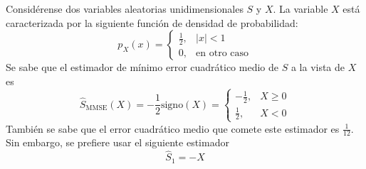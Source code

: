 \ifspanish

\question Considérense dos variables aleatorias unidimensionales $S$ y $X$. La variable $X$ está caracterizada por la siguiente función de densidad de probabilidad:
 $$p_X(x) =  \left\{\begin{array}{ll}
						  	\displaystyle
								  \frac{1}{2}, & |x|<1 \\
	  							  0, & {\mbox{en otro caso}} 
	 					 \end{array} 
						  \right. $$   
Se sabe que el estimador de mínimo error cuadrático medio de $S$ a la vista de $X$ es
 $$\hat{S}_\text{MMSE}(X)= - \frac{1}{2} \mbox{signo}\left(X \right)   =  \left\{\begin{array}{ll}
						  	\displaystyle
								 - \frac{1}{2}, & X \geq 0 \\
	  							 \displaystyle\frac{1}{2}, & X< 0
	 					 \end{array} 
						  \right. $$   
También se sabe que el error cuadrático medio que comete este estimador es $\displaystyle\frac{1}{12}$. Sin embargo, se prefiere usar el siguiente estimador
 $$\hat{S}_1=-X$$

\begin{solution}
\end{solution}


